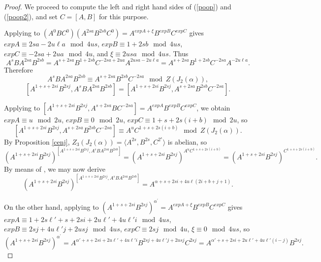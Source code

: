 \documentclass{amsart}
\theoremstyle{definition}
\theoremstyle{remark}
\begin{document}
\begin{proof}
We proceed to compute the left and right hand sides of (\ref{poop}) and (\ref{poop2}), and set $C=[A,B]$ for this purpose.

Applying \cite[Theorem 3.2]{MS3} to $(A^0BC^0)(A^{2sa}B^{2sb}C^0) = A^{expA + \xi} B^{expB} C^{expC}$ gives
    $expA\equiv 2sa-2u\ell a\mod 4us$,
    $expB\equiv 1+2sb\mod 4us$,
    $expC\equiv -2sa+2ua\mod 4u$, and
    $\xi\equiv 2usa\mod 4us$. Thus
		\begin{equation}
\label{poopicat}
		A^s BA^{2sa}B^{2sb}=A^{s+2sa}B^{1+2sb} C^{-2sa+2ua} A^{2usa-2u\ell a}=A^{s+2sa}B^{1+2sb} C^{-2sa}A^{-2u\ell a}.
		\end{equation}
		Therefore
		$$
		A^s BA^{2sa}B^{2sb}\equiv A^{s+2sa}B^{2sb} C^{-2sa}\mod Z(J_2(\alpha)),
		$$
	  \[
    [A^{1+s+2si}B^{2sj},A^s BA^{2sa}B^{2sb}]
    = [A^{1+s+2si}B^{2sj},A^{s+2sa}B^{2sb}C^{-2sa}].
    \]

    Applying \cite[Proposition 3.4]{MS3} to $[A^{1+s+2si}B^{2sj},A^{s+2sa}BC^{-2sa}] = A^{expA} B^{expB} C^{expC}$, we obtain
    $expA\equiv u\mod 2u$,
    $expB\equiv 0\mod 2u$,
    $expC\equiv 1 + s + 2s(i+b)\mod 2u$, so
    \begin{equation}
    \label{corch}
    [A^{1+s+2si}B^{2sj},A^{s+2sa}B^{2sb}C^{-2sa}]\equiv A^{u} C^{1 + s + 2s(i+b)}\mod Z(J_2(\alpha)).
    \end{equation}
    By Proposition \ref{cenj}, $Z_3(J_2(\alpha))=\langle A^{2s},  B^{2s}, C^{2^{s}}\rangle$ is abelian, so
		$$
		(A^{1+s+2si}B^{2sj})^{[A^{1+s+2si}B^{2sj},A^s BA^{2sa}B^{2sb}]}=
		(A^{1+s+2si}B^{2sj})^{A^{u} C^{1 + s + 2s(i+b)}}=(A^{1+s+2si}B^{2sj})^{C^{1 + s + 2s(i+b)}}.
		$$
		By means of \cite[Theorem 3.1]{MS3}, we may now derive
		\begin{equation}
    \label{poopl}
(A^{1+s+2si}B^{2sj})^{[A^{1+s+2si}B^{2sj},A^s BA^{2sa}B^{2sb}]}
    = A^{\alpha + s + 2si  + 4u\ell(2i + b+j+ 1)}.
\end{equation}

 On the other hand, applying \cite[Theorem 3.5]{MS3} to $(A^{1+s+2si}B^{2sj})^{\alpha^\prime} = A^{expA + \xi} B^{expB} C^{expC}$ gives
    $expA\equiv 1 + 2s\ell' + s + 2si + 2u\ell' + 4u\ell' i\mod 4us$,
    $expB\equiv 2sj+4u\ell'j+2usj\mod 4us$,
    $expC\equiv 2sj\mod 4u$,
    $\xi\equiv 0\mod 4us$, so
   \begin{equation}
    \label{poopr}
(A^{1+s+2si}B^{2sj})^{\alpha^\prime}
    = A^{\alpha' + s + 2si + 2u\ell' + 4u\ell' i}B^{2sj+4u\ell'j+2usj}C^{2sj}=
		A^{\alpha' + s + 2si + 2u\ell' + 4u\ell'(i-j)}B^{2sj}.
   \end{equation}


\end{proof}
\end{document}
